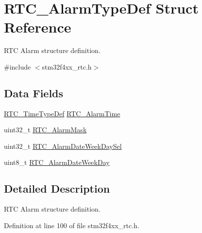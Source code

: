 \hypertarget{struct_r_t_c___alarm_type_def}{\section{R\-T\-C\-\_\-\-Alarm\-Type\-Def Struct Reference}
\label{struct_r_t_c___alarm_type_def}
}


R\-T\-C Alarm structure definition.  




{\ttfamily \#include $<$stm32f4xx\-\_\-rtc.\-h$>$}

\subsection*{Data Fields}
\begin{DoxyCompactItemize}
\item 
\hyperlink{struct_r_t_c___time_type_def}{R\-T\-C\-\_\-\-Time\-Type\-Def} \hyperlink{struct_r_t_c___alarm_type_def_a87078823f156d88aa21b0a1c43cb985c}{R\-T\-C\-\_\-\-Alarm\-Time}
\item 
uint32\-\_\-t \hyperlink{struct_r_t_c___alarm_type_def_a0257c34b484be71007c338374f9fd8fc}{R\-T\-C\-\_\-\-Alarm\-Mask}
\item 
uint32\-\_\-t \hyperlink{struct_r_t_c___alarm_type_def_a8fd76a34adc4e9f85a32a23c2b8bde46}{R\-T\-C\-\_\-\-Alarm\-Date\-Week\-Day\-Sel}
\item 
uint8\-\_\-t \hyperlink{struct_r_t_c___alarm_type_def_a7d6cbb1226c82e91f199446b2601abd0}{R\-T\-C\-\_\-\-Alarm\-Date\-Week\-Day}
\end{DoxyCompactItemize}


\subsection{Detailed Description}
R\-T\-C Alarm structure definition. 

Definition at line 100 of file stm32f4xx\-\_\-rtc.\-h.



